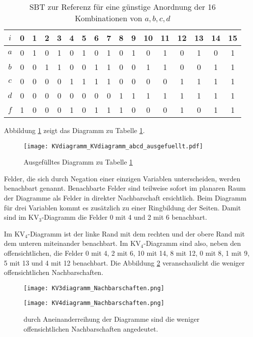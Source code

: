 \begin{table}
\centering
	\begin{tabular}[htbp]{c*{16}{c}}
		$i$ & 0 & 1 & 2 & 3 & 4 & 5 & 6 & 7 & 8 & 9 &10 &11 &12 &13 &14 &15 \\ \hline
		$a$ & 0 & 1 & 0 & 1 & 0 & 1 & 0 & 1 & 0 & 1 & 0 & 1 & 0 & 1 & 0 & 1 \\ 
		$b$ & 0 & 0 & 1 & 1 & 0 & 0 & 1 & 1 & 0 & 0 & 1 & 1 & 0 & 0 & 1 & 1 \\
		$c$ & 0 & 0 & 0 & 0 & 1 & 1 & 1 & 1 & 0 & 0 & 0 & 0 & 1 & 1 & 1 & 1 \\
		$d$ & 0 & 0 & 0 & 0 & 0 & 0 & 0 & 0 & 1 & 1 & 1 & 1 & 1 & 1 & 1 & 1 \\ \hline
		$f$ & 1 & 0 & 0 & 0 & 1 & 0 & 1 & 1 & 1 & 0 & 0 & 0 & 1 & 0 & 1 & 1 \\
	\end{tabular}
\caption{SBT zur Referenz für eine günstige Anordnung der 16 Kombinationen von $a, b, c, d$}
\label{SBT_bsp}
\end{table}

Abbildung \ref{KVdiag_bsp_ausgefuellt} zeigt das Diagramm zu Tabelle \ref{SBT_bsp}.
\begin{figure}[htbp] %
	\centering
	\texttt{[image: KVdiagramm\_KVdiagramm\_abcd\_ausgefuellt.pdf]}
	\caption{Ausgefülltes Diagramm zu Tabelle \ref{SBT_bsp}}
	\label{KVdiag_bsp_ausgefuellt}
\end{figure}

Felder, die sich durch Negation einer einzigen Variablen unterscheiden, werden benachbart genannt. Benachbarte Felder sind teilweise sofort im planaren Raum der Diagramme als Felder in direkter Nachbarschaft ersichtlich. Beim Diagramm für drei Variablen kommt es zusätzlich zu einer Ringbildung der Seiten. Damit sind im KV$_3$-Diagramm die Felder 0 mit 4 und 2 mit 6 benachbart. 

Im KV$_4$-Diagramm ist der linke Rand mit dem rechten und der obere Rand mit dem unteren miteinander benachbart. Im KV$_4$-Diagramm sind also, neben den offensichtlichen, die Felder 0 mit 4, 2 mit 6, 10 mit 14, 8 mit 12, 0 mit 8, 1 mit 9, 5 mit 13 und 4 mit 12 benachbart. Die Abbildung \ref{KVdiag_nachbarschaften} veranschaulicht die weniger offensichtlichen Nachbarschaften.

\begin{figure}[htbp] %
	\centering
	\texttt{[image: KV3diagramm\_Nachbarschaften.png]}
	
	\vspace{.6cm}
	
	\texttt{[image: KV4diagramm\_Nachbarschaften.png]}
	\caption{durch Aneinanderreihung der Diagramme sind die weniger offensichtlichen Nachbarschaften angedeutet.}
	\label{KVdiag_nachbarschaften}
\end{figure}

